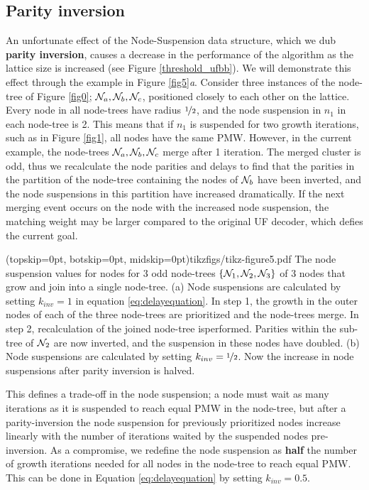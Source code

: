 \subsection{Parity inversion}\label{sec:inversion}

An unfortunate effect of the Node-Suspension data structure, which we dub \textbf{parity inversion}, causes a decrease in the performance of the algorithm as the lattice size is increased (see Figure \ref{threshold_ufbb}). We will demonstrate this effect through the example in Figure \ref{fig5}\emph{a}. Consider three instances of the node-tree of Figure \ref{fig0}; $\mathcal{N}_a, \mathcal{N}_b, \mathcal{N}_c$, positioned closely to each other on the lattice. Every node in all node-trees have radius $\nicefrac{1}{2}$, and the node suspension in $n_1$ in each node-tree is 2. This means that if $n_1$ is suspended for two growth iterations, such as in Figure \ref{fig1}, all nodes have the same PMW. However, in the current example, the node-trees $\mathcal{N}_a, \mathcal{N}_b, \mathcal{N}_c$ merge after 1 iteration. The merged cluster is odd, thus we recalculate the node parities and delays to find that the parities in the partition of the node-tree containing the nodes of $\mathcal{N}_b$ have been inverted, and the node suspensions in this partition have increased dramatically. If the next merging event occurs on the node with the increased node suspension, the matching weight may be larger compared to the original UF decoder, which defies the current goal. 

\Figure[t!](topskip=0pt, botskip=0pt, midskip=0pt){tikzfigs/tikz-figure5.pdf}{
    The node suspension values for nodes for 3 odd node-trees $\{\mathcal{N}_1, \mathcal{N}_2, \mathcal{N}_3\}$ of 3 nodes that grow and join into a single node-tree. (a)
    Node suspensions are calculated by setting $k_{inv}=1$ in equation \eqref{eq:delayequation}. In step 1, the growth in the outer nodes of each of the three node-trees are prioritized and the node-trees merge. In step 2, recalculation of the joined node-tree isperformed. Parities within the sub-tree of $\mathcal{N}_2$ are now inverted, and the suspension in these nodes have doubled. (b) Node suspensions are calculated by setting $k_{inv}=\nicefrac{1}{2}$. Now the increase in node suspensions after parity inversion is halved.\label{fig5}}

This defines a trade-off in the node suspension; a node must wait as many iterations as it is suspended to reach equal PMW in the node-tree, but after a parity-inversion the node suspension for previously prioritized nodes increase linearly with the number of iterations waited by the suspended nodes pre-inversion. As a compromise, we redefine the node suspension as \textbf{half} the number of growth iterations needed for all nodes in the node-tree to reach equal PMW. This can be done in Equation \eqref{eq:delayequation} by setting $k_{inv}=0.5$.


